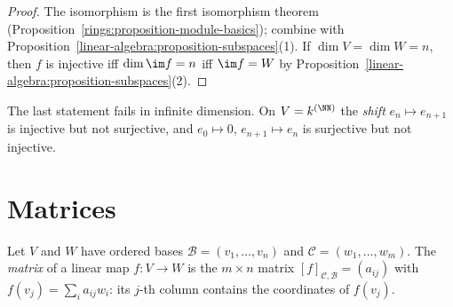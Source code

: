 \begin{proof}
The isomorphism is the first isomorphism theorem
(Proposition~\ref{rings:proposition-module-basics}); combine with
Proposition~\ref{linear-algebra:proposition-subspaces}(1). If $\dim V = \dim W = n$, then $f$ is
injective iff $\dim \im f = n$ iff $\im f = W$ by
Proposition~\ref{linear-algebra:proposition-subspaces}(2).
\end{proof}

\begin{counterexample}\label{linear-algebra:counterexample-shift}
The last statement fails in infinite dimension. On $V = k^{(\NN)}$ the \emph{shift}
$e_n \mapsto e_{n+1}$ is injective but not surjective, and $e_0 \mapsto 0$, $e_{n+1} \mapsto e_n$ is
surjective but not injective.
\end{counterexample}

\section{Matrices}\label{linear-algebra:section-matrices}

\begin{definition}\label{linear-algebra:definition-matrix}
Let $V$ and $W$ have ordered bases $\mathcal{B} = (v_1, \ldots, v_n)$ and $\mathcal{C} = (w_1, \ldots, w_m)$.
The \emph{matrix} of a linear map $f \colon V \to W$ is the $m \times n$ matrix
$[f]_{\mathcal{C}, \mathcal{B}} = (a_{ij})$ with $f(v_j) = \sum_i a_{ij} w_i$: its $j$-th column contains the
coordinates of $f(v_j)$.
\end{definition}

